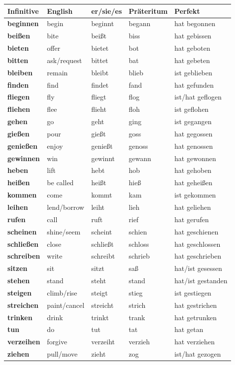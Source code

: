 \begin{center}
\small
{}
\begin{tabularx}{\textwidth}{@{}>{\bfseries}l l l l X@{}}
\toprule
Infinitive & English & er/sie/es & Präteritum & Perfekt \\
\midrule
beginnen & begin & beginnt & begann & hat begonnen \\
beißen & bite & beißt & biss & hat gebissen \\
bieten & offer & bietet & bot & hat geboten \\
bitten & ask/request & bittet & bat & hat gebeten \\
bleiben & remain & bleibt & blieb & ist geblieben \\
finden & find & findet & fand & hat gefunden \\
fliegen & fly & fliegt & flog & ist/hat geflogen \\
fliehen & flee & flieht & floh & ist geflohen \\
gehen & go & geht & ging & ist gegangen \\
gießen & pour & gießt & goss & hat gegossen \\
genießen & enjoy & genießt & genoss & hat genossen \\
gewinnen & win & gewinnt & gewann & hat gewonnen \\
heben & lift & hebt & hob & hat gehoben \\
heißen & be called & heißt & hieß & hat geheißen \\
kommen & come & kommt & kam & ist gekommen \\
leihen & lend/borrow & leiht & lieh & hat geliehen \\
rufen & call & ruft & rief & hat gerufen \\
scheinen & shine/seem & scheint & schien & hat geschienen \\
schließen & close & schließt & schloss & hat geschlossen \\
schreiben & write & schreibt & schrieb & hat geschrieben \\
sitzen & sit & sitzt & saß & hat/ist gesessen \\
stehen & stand & steht & stand & hat/ist gestanden \\
steigen & climb/rise & steigt & stieg & ist gestiegen \\
streichen & paint/cancel & streicht & strich & hat gestrichen \\
trinken & drink & trinkt & trank & hat getrunken \\
tun & do & tut & tat & hat getan \\
verzeihen & forgive & verzeiht & verzieh & hat verziehen \\
ziehen & pull/move & zieht & zog & ist/hat gezogen \\
\bottomrule
\end{tabularx}
\end{center}

